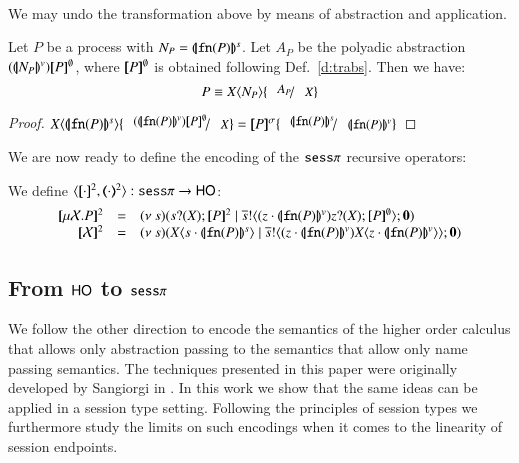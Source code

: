  \\
We may undo the transformation above by means of abstraction and application.
\begin{proposition}
Let $P$ be a \HOp process with $N_P = (\!|\!|\mathtt{fn}(P)|\!|\!)^s$.
Let $A_P$ be the polyadic abstraction $\abs{\vmap{N_P}}\pmap{P}{\emptyset}$, where 
$[\!\![P]\!\!]^\emptyset$ is obtained following Def.~\ref{d:trabs}.
Then we have:
$$
P \scong \appl{X}{N_P}\subst{A_P}{X}
$$
\end{proposition}

\begin{proof}
	$\appl{X}{\smap{\fn{P}}} \subst{(\vmap{\fn{P}}) \map{P}^{\emptyset}}{X} =
	\map{P}^{\sigma} \subst{\smap{\fn{P}}}{\vmap{\fn{P}}}$ 
\end{proof}

We are now ready to define the encoding of the $\mathtt{sess}\pi$ recursive
operators:
\begin{definition}
	We define $\encod{\cdot}{\cdot}{2}: \sesp \to \HO$:
\[
\begin{array}{rcl}
	\map{\rec{X}{P}}^{2} &=& \newsp{s}{\binp{s}{\X} \map{P}^{2} \Par \bout{\dual{s}}{\abs{z \cat \vmap{\fn{P}}}{\binp{z}{\X} \map{P}^{\es}}} \inact}\\
	\map{\rvar{X}}^{2} &=& \newsp{s}{\appl{\X}{s \cat \smap{\fn{P}}} \Par \bout{\dual{s}}{ \abs{z \cat \vmap{\fn{P}}}{\appl{X}{z \cat \vmap{\fn{P}}}}} \inact}
\end{array}
\]
\end{definition}



\subsection{From $\mathsf{HO}$ to $\mathtt{sess}\pi$}

We follow the other direction to encode the semantics of the
higher order calculus that allows only abstraction passing
to the semantics that allow only name passing semantics.
The techniques presented in this paper were originally developed
by Sangiorgi in \cite{}. In this work we show that
the same ideas can be applied in a session type setting.
Following the principles of session types we furthermore
study the limits on such encodings when it comes to the linearity
of session endpoints.

